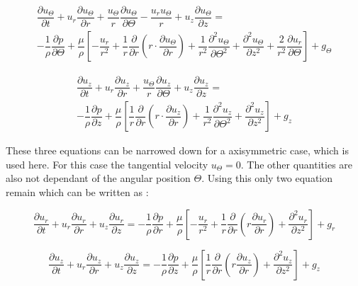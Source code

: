 \documentclass[../thesis.tex]{subfiles}
\begin{document}
\begin{gather}
	\label{eqn:Navier-Theta}
	\dfrac{\partial u_\Theta}{\partial t} + u_r \dfrac{\partial u_\Theta}{\partial r} + \dfrac{u_\Theta}{ r} \dfrac{\partial u_\Theta}{\partial \Theta} - \dfrac{u_r u_\Theta}{r} + u_z \dfrac{\partial u_\Theta}{\partial z} = \\ \nonumber
	-\dfrac{1}{\rho} \dfrac{\partial p}{\partial \Theta} + \dfrac{\mu}{\rho} \left[
	- \dfrac{u_r}{r^2} + \dfrac{1}{r} \dfrac{\partial}{\partial r} \left( r \cdot \dfrac{\partial u_\Theta}{\partial r} \right) +
	\dfrac{1}{r^2} \dfrac{\partial^2 u_\Theta}{\partial \Theta^2} + \dfrac{\partial^2 u_\Theta}{\partial z^2} + \dfrac{2}{r^2} \dfrac{\partial u_r}{\partial \Theta}
	\right] + g_\Theta
\end{gather}


\begin{gather}
	\label{eqn:Navier-z}
	\dfrac{\partial u_z}{\partial t} + u_r \dfrac{\partial u_z}{\partial r} + \dfrac{u_\Theta}{ r} \dfrac{\partial u_z}{\partial \Theta} + u_z \dfrac{\partial u_z}{\partial z} = \\ \nonumber
	-\dfrac{1}{\rho} \dfrac{\partial p}{\partial z} + \dfrac{\mu}{\rho} \left[
	\dfrac{1}{r} \dfrac{\partial}{\partial r} \left( r \cdot \dfrac{\partial u_z}{\partial r} \right) +
	\dfrac{1}{r^2} \dfrac{\partial^2 u_z}{\partial \Theta^2} + \dfrac{\partial^2 u_z}{\partial z^2}
	\right] + g_z
\end{gather}

These three equations can be narrowed down for a axisymmetric case, which is used here. For this case the tangential velocity $u_\Theta = 0$. The other quantities are also not dependant of the angular position $\Theta$. Using this only two equation remain which can be written as \cite{vitturi2016navier}:

\begin{equation}
	\dfrac{\partial u_r}{\partial t} + u_r \dfrac{\partial u_r}{\partial r}+ u_z \dfrac{\partial u_r}{\partial z} = - \dfrac{1}{\rho} \dfrac{\partial p}{\partial r} +  \dfrac{\mu}{\rho} \left[ -\dfrac{u_r}{r^2} + \dfrac{1}{r} \dfrac{\partial}{\partial r} \left( r \dfrac{\partial u_r}{\partial r} \right) + \dfrac{\partial^2 u_r}{\partial z^2} \right]	+ g_r
\end{equation}

\begin{equation}
	\dfrac{\partial u_z}{\partial t} + u_r \dfrac{\partial u_z}{\partial r}+ u_z \dfrac{\partial u_z}{\partial z} = - \dfrac{1}{\rho} \dfrac{\partial p}{\partial z} + \dfrac{\mu}{\rho} \left[ \dfrac{1}{r} \dfrac{\partial}{\partial r} \left( r \dfrac{\partial u_z}{\partial r} \right) + \dfrac{\partial^2 u_z}{\partial z^2} \right]	+ g_z
\end{equation} 
\end{document}
